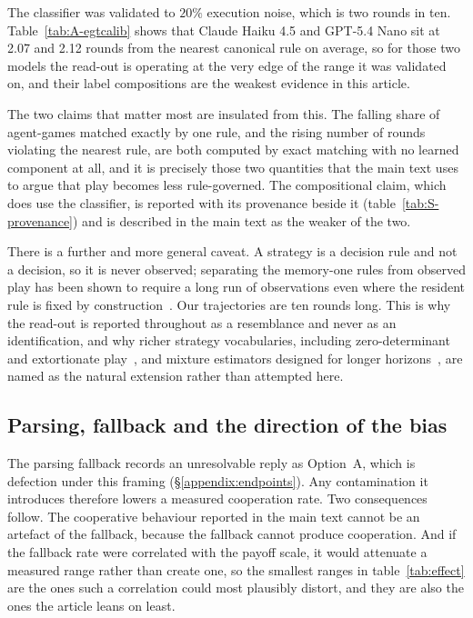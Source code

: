 \documentclass[openacc]{rsproca_new}
\begin{document}
The classifier was validated to $20\%$ execution noise, which is two rounds in
ten. Table~\ref{tab:A-egtcalib} shows that Claude Haiku 4.5 and GPT-5.4 Nano
sit at 2.07 and 2.12 rounds from the nearest canonical rule on average, so for
those two models the read-out is operating at the very edge of the range it was
validated on, and their label compositions are the weakest evidence in this
article.

The two claims that matter most are insulated from this. The falling share of
agent-games matched exactly by one rule, and the rising number of rounds
violating the nearest rule, are both computed by exact matching with no learned
component at all, and it is precisely those two quantities that the main text
uses to argue that play becomes less rule-governed. The compositional claim,
which does use the classifier, is reported with its provenance beside it
(table~\ref{tab:S-provenance}) and is described in the main text as the weaker
of the two.

There is a further and more general caveat. A strategy is a decision rule and
not a decision, so it is never observed; separating the memory-one rules from
observed play has been shown to require a long run of observations even where
the resident rule is fixed by construction~\cite{kim2021win,hilbe2013memory}.
Our trajectories are ten rounds long. This is why the read-out is reported
throughout as a resemblance and never as an identification, and why richer
strategy vocabularies, including zero-determinant and extortionate
play~\cite{pressDyson2012}, and mixture estimators designed for longer
horizons~\cite{fontana2025nicer,inferenceStrategies}, are named as the natural
extension rather than attempted here.

\subsection{Parsing, fallback and the direction of the bias}\label{appendix:robust_parsing}

The parsing fallback records an unresolvable reply as Option~A, which is
defection under this framing (\S\ref{appendix:endpoints}). Any contamination it
introduces therefore lowers a measured cooperation rate. Two consequences
follow. The cooperative behaviour reported in the main text cannot be an
artefact of the fallback, because the fallback cannot produce cooperation. And
if the fallback rate were correlated with the payoff scale, it would attenuate
a measured range rather than create one, so the smallest ranges in
table~\ref{tab:effect} are the ones such a correlation could most plausibly
distort, and they are also the ones the article leans on least.
\end{document}
